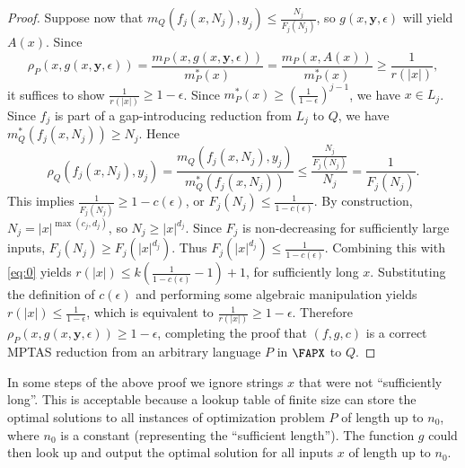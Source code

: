 \documentclass{article}
\begin{document}
\begin{proof}
  Suppose now that $m_Q(f_j(x, N_j), y_j) \leq \frac{N_j}{F_j(N_j)}$, so $g(x, \mathbf{y}, \epsilon)$ will yield $A(x)$.
  Since
  \begin{equation*}
    \rho_P(x, g(x, \mathbf{y}, \epsilon)) = \frac{m_P(x, g(x, \mathbf{y}, \epsilon))}{m_P^*(x)} = \frac{m_P(x, A(x))}{m_P^*(x)} \geq \frac{1}{r(|x|)},
  \end{equation*}
  it suffices to show $\frac{1}{r(|x|)} \geq 1 - \epsilon$.
  Since $m_P^*(x) \geq (\frac{1}{1 - \epsilon})^{j - 1}$, we have $x \in L_j$.
  Since $f_j$ is part of a gap-introducing reduction from $L_j$ to $Q$, we have $m_Q^*(f_j(x, N_j)) \geq N_j$.
  Hence
  \begin{equation*}
    \rho_Q(f_j(x, N_j), y_j) = \frac{m_Q(f_j(x, N_j), y_j)}{m_Q^*(f_j(x, N_j))} \leq \frac{\frac{N_j}{F_j(N_j)}}{N_j} = \frac{1}{F_j(N_j)}.
  \end{equation*}
  This implies $\frac{1}{F_j(N_j)} \geq 1 - c(\epsilon)$, or $F_j(N_j) \leq \frac{1}{1 - c(\epsilon)}$.
  By construction, $N_j = |x|^{\max(c_j, d_j)}$, so $N_j \geq |x|^{d_j}$.
  Since $F_j$ is non-decreasing for sufficiently large inputs, $F_j(N_j) \geq F_j(|x|^{d_j})$.
  Thus $F_j(|x|^{d_j}) \leq \frac{1}{1 - c(\epsilon)}$.
  Combining this with \autoref{eq:0} yields $r(|x|) \leq k\left(\frac{1}{1 - c(\epsilon)} - 1\right) + 1$, for sufficiently long $x$.
  Substituting the definition of $c(\epsilon)$ and performing some algebraic manipulation yields $r(|x|) \leq \frac{1}{1 - \epsilon}$, which is equivalent to $\frac{1}{r(|x|)} \geq 1 - \epsilon$.
  Therefore $\rho_P(x, g(x, \mathbf{y}, \epsilon)) \geq 1 - \epsilon$, completing the proof that $(f, g, c)$ is a correct MPTAS reduction from an arbitrary language $P$ in $\FAPX$ to $Q$.
\end{proof}

In some steps of the above proof we ignore strings $x$ that were not ``sufficiently long''.
This is acceptable because a lookup table of finite size can store the optimal solutions to all instances of optimization problem $P$ of length up to $n_0$, where $n_0$ is a constant (representing the ``sufficient length'').
The function $g$ could then look up and output the optimal solution for all inputs $x$ of length up to $n_0$.
\end{document}
